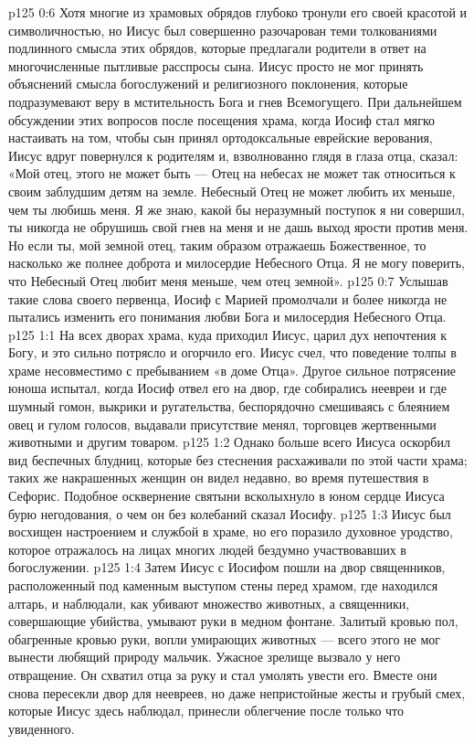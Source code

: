 \vs p125 0:6 Хотя многие из храмовых обрядов глубоко тронули его своей красотой и символичностью, но Иисус был совершенно разочарован теми толкованиями подлинного смысла этих обрядов, которые предлагали родители в ответ на многочисленные пытливые расспросы сына. Иисус просто не мог принять объяснений смысла богослужений и религиозного поклонения, которые подразумевают веру в мстительность Бога и гнев Всемогущего. При дальнейшем обсуждении этих вопросов после посещения храма, когда Иосиф стал мягко настаивать на том, чтобы сын принял ортодоксальные еврейские верования, Иисус вдруг повернулся к родителям и, взволнованно глядя в глаза отца, сказал: «Мой отец, этого не может быть --- Отец на небесах не может так относиться к своим заблудшим детям на земле. Небесный Отец не может любить их меньше, чем ты любишь меня. Я же знаю, какой бы неразумный поступок я ни совершил, ты никогда не обрушишь свой гнев на меня и не дашь выход ярости против меня. Но если ты, мой земной отец, таким образом отражаешь Божественное, то насколько же полнее доброта и милосердие Небесного Отца. Я не могу поверить, что Небесный Отец любит меня меньше, чем отец земной».
\vs p125 0:7 Услышав такие слова своего первенца, Иосиф с Марией промолчали и более никогда не пытались изменить его понимания любви Бога и милосердия Небесного Отца.
\vs p125 1:1 На всех дворах храма, куда приходил Иисус, царил дух непочтения к Богу, и это сильно потрясло и огорчило его. Иисус счел, что поведение толпы в храме несовместимо с пребыванием «в доме Отца». Другое сильное потрясение юноша испытал, когда Иосиф отвел его на двор, где собирались неевреи и где шумный гомон, выкрики и ругательства, беспорядочно смешиваясь с блеянием овец и гулом голосов, выдавали присутствие менял, торговцев жертвенными животными и другим товаром.
\vs p125 1:2 Однако больше всего Иисуса оскорбил вид беспечных блудниц, которые без стеснения расхаживали по этой части храма; таких же накрашенных женщин он видел недавно, во время путешествия в Сефорис. Подобное осквернение святыни всколыхнуло в юном сердце Иисуса бурю негодования, о чем он без колебаний сказал Иосифу.
\vs p125 1:3 Иисус был восхищен настроением и службой в храме, но его поразило духовное уродство, которое отражалось на лицах многих людей бездумно участвовавших в богослужении.
\vs p125 1:4 Затем Иисус с Иосифом пошли на двор священников, расположенный под каменным выступом стены перед храмом, где находился алтарь, и наблюдали, как убивают множество животных, а священники, совершающие убийства, умывают руки в медном фонтане. Залитый кровью пол, обагренные кровью руки, вопли умирающих животных --- всего этого не мог вынести любящий природу мальчик. Ужасное зрелище вызвало у него отвращение. Он схватил отца за руку и стал умолять увести его. Вместе они снова пересекли двор для неевреев, но даже непристойные жесты и грубый смех, которые Иисус здесь наблюдал, принесли облегчение после только что увиденного.
